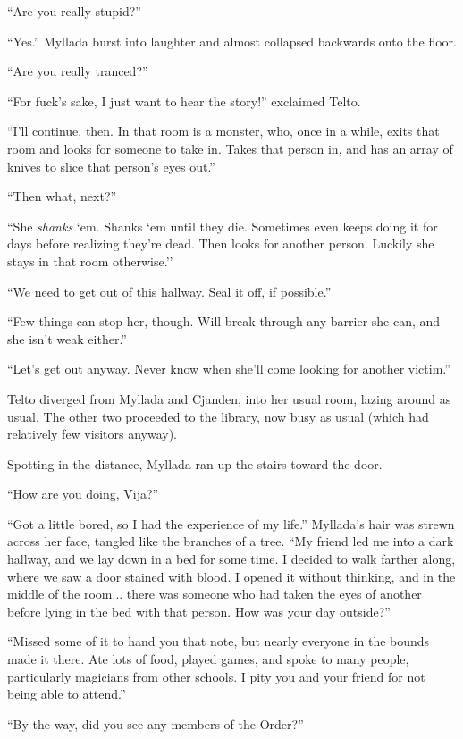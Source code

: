 ``Are you really stupid?''

``Yes.'' Myllada burst into laughter and almost collapsed backwards onto the floor.

``Are you really tranced?''

``For fuck's sake, I just want to hear the story!'' exclaimed Telto.

``I'll continue, then. In that room is a monster, who, once in a while, exits that room and looks for someone to take in. Takes that person in, and has an array of knives to slice that person's eyes out.''

``Then what, next?''

``She \emph{shanks} `em. Shanks `em until they die. Sometimes even keeps doing it for days before realizing they're dead. Then looks for another person. Luckily she stays in that room otherwise.''

``We need to get out of this hallway. Seal it off, if possible.''

``Few things can stop her, though. Will break through any barrier she can, and she isn't weak either.''

``Let's get out anyway. Never know when she'll come looking for another victim.''

\centeredstars

Telto diverged from Myllada and Cjanden, into her usual room, lazing around as usual. The other two proceeded to the library, now busy as usual (which had relatively few visitors anyway).

Spotting \yronsyncra{} in the distance, Myllada ran up the stairs toward the door.

``How are you doing, Vija?''

``Got a little bored, so I had the experience of my life.'' Myllada's hair was strewn across her face, tangled like the branches of a tree. ``My friend led me into a dark hallway, and we lay down in a bed for some time. I decided to walk farther along, where we saw a door stained with blood. I opened it without thinking, and in the middle of the room... there was someone who had taken the eyes of another before lying in the bed with that person. How was your day outside?''

``Missed some of it to hand you that note, but nearly everyone in the bounds made it there. Ate lots of food, played games, and spoke to many people, particularly magicians from other schools. I pity you and your friend for not being able to attend.''

``By the way, did you see any members of the Order?''

